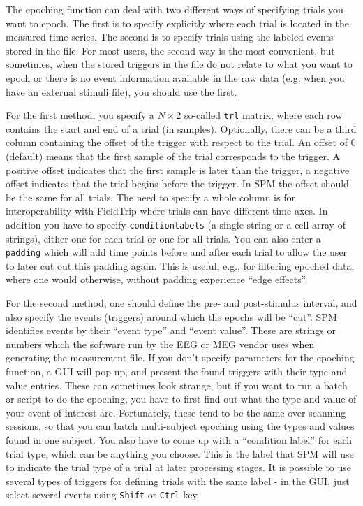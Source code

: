 The epoching function can deal with two different ways of specifying trials you want to epoch. The first is to specify explicitly where each trial is located in the measured time-series. The second is to specify trials using the labeled events stored in the file. For most users, the second way is the most convenient, but sometimes, when the stored triggers in the file do not relate to what you want to epoch or there is no event information available in the raw data (e.g. when you have an external stimuli file), you should use the first.

For the first method, you specify a $N \times 2$ so-called \texttt{trl} matrix, where each row contains the start and end of a trial (in samples). Optionally, there can be a third column containing the offset of the trigger with respect to the trial. An offset of 0 (default) means that the first sample of the trial corresponds to the trigger. A positive offset indicates that the first sample is later than the trigger, a negative offset indicates that the trial begins before the trigger. In SPM the offset should be the same for all trials. The need to specify a whole column is for interoperability with FieldTrip where trials can have different time axes. In addition you have to specify \texttt{conditionlabels} (a single string or a cell array of strings), either one for each trial or one for all trials. You can also enter a \texttt{padding} which will add time points before and after each trial to allow the user to later cut out this padding again. This is useful, e.g., for filtering epoched data, where one would otherwise, without padding experience ``edge effects''.

For the second method, one should define the pre- and post-stimulus interval, and also specify the events (triggers) around which the epochs will be ``cut''. SPM identifies events by their ``event type'' and ``event value''. These are strings or numbers which the software run by the EEG or MEG vendor uses when generating the measurement file. If you don't specify parameters for the epoching function, a GUI will pop up, and present the found triggers with their type and value entries. These can sometimes look strange, but if you want to run a batch or script to do the epoching, you have to first find out what the type and value of your event of interest are. Fortunately, these tend to be the same over scanning sessions, so that you can batch multi-subject epoching using the types and values found in one subject. You also have to come up with a ``condition label'' for each trial type, which can be anything you choose. This is the label that SPM will use to indicate the trial type of a trial at later processing stages. It is possible to use several types of triggers for defining trials with the same label - in the GUI, just select several events using \texttt{Shift} or \texttt{Ctrl} key.

